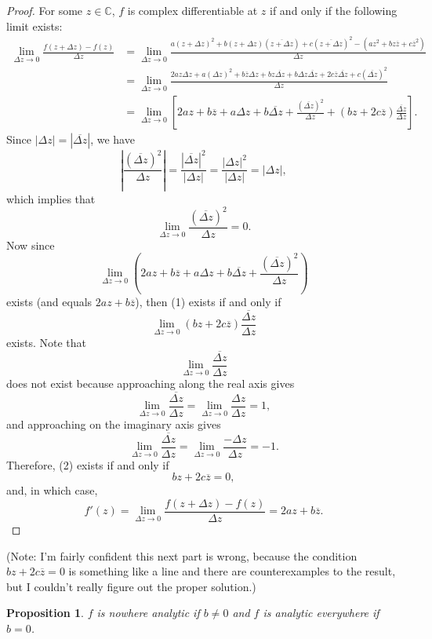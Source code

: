 \documentclass[12pt]{article}
\newtheorem{proposition}{Proposition}
\newcommand{\conj}[1]{\overline{#1}}
\newcommand{\C}{\mathbb{C}}
\begin{document}
\begin{proof}
    For some $z\in\C$, $f$ is complex differentiable at $z$ if and only if the following limit exists:
    \begin{align}
        \lim_{\Delta z \to 0}\frac{f(z+\Delta z) - f(z)}{\Delta z}
            &= \lim_{\Delta z \to 0}\frac{a(z+\Delta z)^2 + b(z+\Delta z)\left(\conj{z+\Delta z}\right) + c\left(\conj{z+\Delta z}\right)^2 - (az^2 + bz\conj{z} + c\conj{z}^2)}{\Delta z} \nonumber\\ 
            &= \lim_{\Delta z \to 0}\frac{2az\Delta z + a(\Delta z)^2 + b\conj{z}\Delta z + bz\conj{\Delta z} + b\Delta z \conj{\Delta z} + 2c\conj{z}\conj{\Delta z} + c\left(\conj{\Delta z}\right)^2}{\Delta z} \nonumber\\ 
            &= \lim_{\Delta z \to 0}\left[2az + b\conj{z} + a\Delta z + b\conj{\Delta z} + \frac{(\conj{\Delta z})^2}{\Delta z} + (bz + 2c\conj z)\frac{\conj{\Delta z}}{\Delta z}\right].
    \end{align}
    Since $|\Delta z| = |\conj{\Delta z}|$, we have
    \[\left|\frac{(\conj{\Delta z})^2}{\Delta z}\right| = \frac{|\conj{\Delta z}|^2}{|\Delta z|} = \frac{|\Delta z|^2}{|\Delta z|} = |\Delta z|,\]
    which implies that
    \[\lim_{\Delta z \to 0} \frac{(\conj{\Delta z})^2}{\Delta z} = 0.\]
    Now since
    \[\lim_{\Delta z \to 0}\left(2az + b\conj{z} + a\Delta z + b\conj{\Delta z} + \frac{(\conj{\Delta z})^2}{\Delta z}\right)\]
    exists (and equals $2az + b\conj{z}$), then (1) exists if and only if
    \begin{equation}\lim_{\Delta z \to 0}(bz + 2c\conj z)\frac{\conj{\Delta z}}{\Delta z}\end{equation}
    exists. Note that
    \[\lim_{\Delta z \to 0}\frac{\conj{\Delta z}}{\Delta z}\]
    does not exist because approaching along the real axis gives
    \[\lim_{\Delta z \to 0}\frac{\conj{\Delta z}}{\Delta z} = \lim_{\Delta z \to 0}\frac{\Delta z}{\Delta z} = 1,\]
    and approaching on the imaginary axis gives
    \[\lim_{\Delta z \to 0}\frac{\conj{\Delta z}}{\Delta z} = \lim_{\Delta z \to 0}\frac{-\Delta z}{\Delta z} = -1.\]
    Therefore, (2) exists if and only if
    \[bz+2c\conj{z} = 0,\]
    and, in which case,
    \[f'(z) =  \lim_{\Delta z \to 0}\frac{f(z+\Delta z) - f(z)}{\Delta z} = 2az + b\conj{z}.\]
    
\end{proof}

(Note: I'm fairly confident this next part is wrong, because the condition $bz+2c\conj{z}=0$ is something like a line and there are counterexamples to the result, but I couldn't really figure out the proper solution.)
\begin{proposition}
    $f$ is nowhere analytic if $b\ne0$ and $f$ is analytic everywhere if $b=0$.
\end{proposition}
\end{document}
